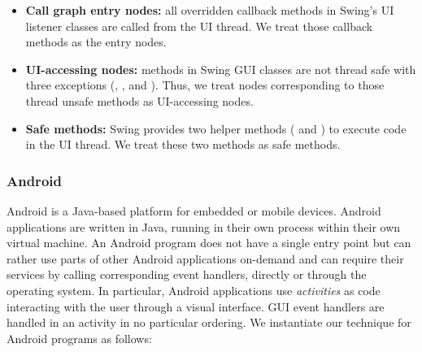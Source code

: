 \begin{itemize}

\item \textbf{Call graph entry nodes: } all overridden callback methods in 
Swing's UI listener classes are called from the UI thread. We treat those callback
methods as the entry nodes.


\item \textbf{UI-accessing nodes:} %
methods in Swing GUI classes are not thread safe with three exceptions (,
, and ). Thus, we
treat nodes corresponding to those thread unsafe methods %
as UI-accessing nodes.

\item \textbf{Safe methods: }  Swing provides two helper methods
( and ) to execute code in the UI thread.
We treat these two methods as safe methods.

\end{itemize}


\subsubsection{Android}

Android is a Java-based platform for embedded or mobile devices. 
Android applications are written in Java, running in their own process within their own virtual machine.
An Android program does not have a single entry point but can
rather use parts of other Android applications on-demand and can require their
services by calling corresponding event handlers, directly or through the
operating system. In particular, Android applications use \textit{activities}
as code interacting with the user through a visual interface. GUI event handlers
are handled in an activity  in no particular ordering.
We instantiate our technique for Android programs as follows:

